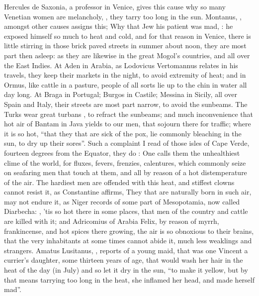 Hercules de Saxonia, a professor in Venice, gives this
cause why so many Venetian women are melancholy, ,
they tarry too long in the sun. Montanus, ,
amongst other causes assigns this; Why that Jew his patient was mad, : he exposed himself so much to heat
and cold, and for that reason in Venice, there is little stirring in those
brick paved streets in summer about noon, they are most part then asleep: as
they are likewise in the great Mogol's countries, and all over the East Indies.
At Aden in Arabia, as Lodovicus Vertomannus relates in his
travels, they keep their markets in the night, to avoid extremity of heat; and
in Ormus, like cattle in a pasture, people of all sorts lie up to the chin in
water all day long. At Braga in Portugal; Burgos in Castile; Messina in Sicily,
all over Spain and Italy, their streets are most part narrow, to avoid the
sunbeams. The Turks wear great turbans , to
refract the sunbeams; and much inconvenience that hot air of Bantam in Java
yields to our men, that sojourn there for traffic; where it is so hot,
\enquote{that they that are sick of the pox, lie commonly
bleaching in the sun, to dry up their sores}. Such a complaint I read of those
isles of Cape Verde, fourteen degrees from the Equator, they do : One calls them the unhealthiest clime of the
world, for fluxes, fevers, frenzies, calentures, which commonly seize on
seafaring men that touch at them, and all by reason of a hot distemperature of
the air. The hardiest men are offended with this heat, and stiffest clowns
cannot resist it, as Constantine affirms,  They that are naturally born in such air, may not
endure it, as Niger records of some part of Mesopotamia,
now called Diarbecha: , 'tis so hot
there in some places, that men of the country and cattle are killed with it;
and Adricomius of Arabia Felix, by reason of myrrh,
frankincense, and hot spices there growing, the air is so obnoxious to their
brains, that the very inhabitants at some times cannot abide it, much less
weaklings and strangers. Amatus Lusitanus,
, reports of a young maid, that was
one Vincent a currier's daughter, some thirteen years of age, that would wash
her hair in the heat of the day (in July) and so let it dry in the sun,
\enquote{to make it yellow, but by that means tarrying too long in
the heat, she inflamed her head, and made herself mad}.


